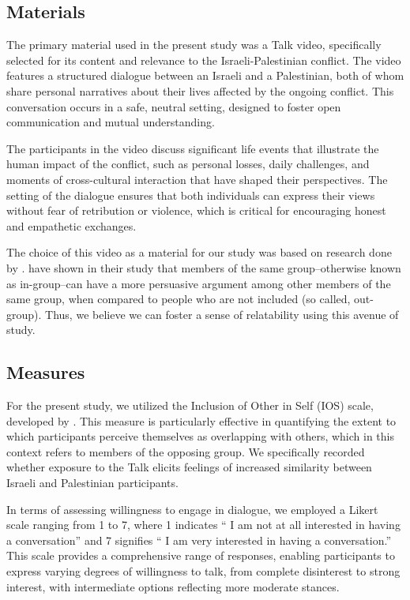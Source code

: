 \documentclass[stu,12pt,floatsintext]{apa7}
\begin{document}
\subsection{Materials}

The primary material used in the present study was a \textcite{tedvideo} Talk video, specifically selected for its content and relevance to the Israeli-Palestinian conflict. The video features a structured dialogue between an Israeli and a Palestinian, both of whom share personal narratives about their lives affected by the ongoing conflict. This conversation occurs in a safe, neutral setting, designed to foster open communication and mutual understanding.

The participants in the video discuss significant life events that illustrate the human impact of the conflict, such as personal losses, daily challenges, and moments of cross-cultural interaction that have shaped their perspectives. The setting of the dialogue ensures that both individuals can express their views without fear of retribution or violence, which is critical for encouraging honest and empathetic exchanges.

The choice of this video as a material for our study was based on research done by \textcite{sunstein2015wiser}. \textcite{sunstein2015wiser} have shown in their study that members of the same group--otherwise known as in-group--can have a more persuasive argument among other members of the same group, when compared to people who are not included (so called, out-group). Thus, we believe we can foster a sense of relatability using this avenue of study.

\subsection{Measures}

For the present study, we utilized the Inclusion of Other in Self (IOS) scale, developed by \textcite{aron1992inclusion}. This measure is particularly effective in quantifying the extent to which participants perceive themselves as overlapping with others, which in this context refers to members of the opposing group. We specifically recorded whether exposure to the \textcite{tedvideo} Talk elicits feelings of increased similarity between Israeli and Palestinian participants.

In terms of assessing willingness to engage in dialogue, we employed a Likert scale ranging from 1 to 7, where 1 indicates `` I am not at all interested in having a conversation''  and 7 signifies `` I am very interested in having a conversation.''  This scale provides a comprehensive range of responses, enabling participants to express varying degrees of willingness to talk, from complete disinterest to strong interest, with intermediate options reflecting more moderate stances.
\end{document}
